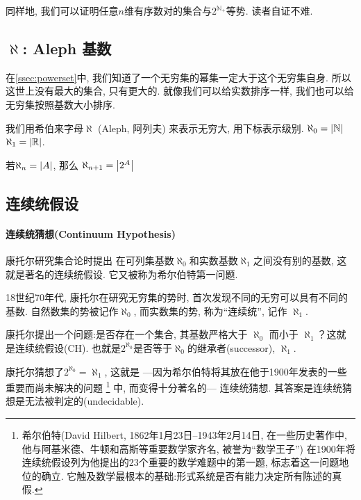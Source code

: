 同样地, 我们可以证明任意$n$维有序数对的集合与$2^{\mathbb{N}_+} $等势. 读者自证不难.

\subsection{\texorpdfstring{$\aleph $: Aleph 基数}{Aleph 基数}}

在\cref{ssec:powerset}中, 我们知道了一个无穷集的幂集一定大于这个无穷集自身. 所以这世上没有最大的集合, 只有更大的.
就像我们可以给实数排序一样, 我们也可以给无穷集按照基数大小排序.

我们用希伯来字母$\aleph$ (Aleph, 阿列夫) 来表示无穷大, 用下标表示级别. $\aleph_0 = \left\lvert \mathbb{N} \right\rvert$
$\aleph_1 = \left\lvert \mathbb{R} \right\rvert$.

\begin{definition}[无穷基数]
  若$\aleph_n =\left\lvert A \right\rvert$, 那么 $\aleph_{n+1} = \left\lvert 2^{A}  \right\rvert$
\end{definition}

\subsection{连续统假设}

\paragraph{连续统猜想(Continuum Hypothesis)}
康托尔研究集合论时提出
在可列集基数$\aleph_0$和实数基数$\aleph_{1}$之间没有别的基数, 这就是著名的连续统假设. 它又被称为希尔伯特第一问题.

\begin{note}
  18世纪70年代, 康托尔在研究无穷集的势时,
  首次发现不同的无穷可以具有不同的基数.
  自然数集的势被记作$\aleph_{0}$, 而实数集的势, 称为“连续统”, 记作 $\aleph_{1}$.

  康托尔提出一个问题:是否存在一个集合, 其基数严格大于 $\aleph_{0}$ 而小于 $\aleph_{1}$？这就是连续统假设(CH).
  也就是$2^{\aleph_0}$是否等于$\aleph_0$的继承者(successor), $\aleph_1$.

  康托尔猜想了$2^{\aleph_0}=\aleph_1$, 这就是
  ---因为希尔伯特将其放在他于1900年发表的一些重要而尚未解决的问题
  \footnote{希尔伯特(David Hilbert, 1862年1月23日--1943年2月14日,
    在一些历史著作中, 他与阿基米德、牛顿和高斯等重要数学家齐名, 被誉为“数学王子”)
    在1900年将连续统假设列为他提出的23个重要的数学难题中的第一题,
  标志着这一问题地位的确立. 它触及数学最根本的基础:形式系统是否有能力决定所有陈述的真假. }
  中, 而变得十分著名的---
  连续统猜想.
  其答案是连续统猜想是无法被判定的(undecidable).
\end{note}

